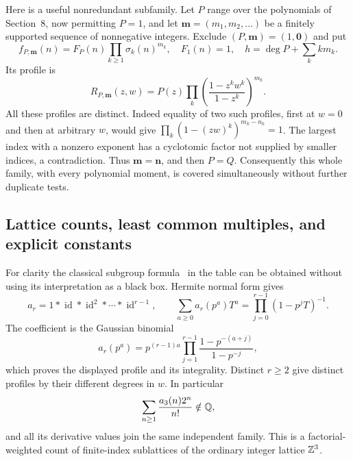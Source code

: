 Here is a useful nonredundant subfamily.  Let $P$ range over the
polynomials of Section~8, now permitting $P=1$, and let
$\mathbf m=(m_1,m_2,\ldots)$ be a finitely supported sequence of
nonnegative integers.  Exclude $(P,\mathbf m)=(1,\mathbf0)$ and put
\[
 f_{P,\mathbf m}(n)=F_P(n)\prod_{k\geq1}\sigma_k(n)^{m_k},
 \quad F_1(n)=1,\quad
 h=\deg P+\sum_k km_k.
\]
Its profile is
\begin{equation}\label{eq:sigma-product-profile}
 R_{P,\mathbf m}(z,w)=P(z)
       \prod_k\left(\frac{1-z^kw^k}{1-z^k}\right)^{m_k}.
\end{equation}
All these profiles are distinct.  Indeed equality of two such
profiles, first at $w=0$ and then at arbitrary $w$, would give
$\prod_k(1-(zw)^k)^{m_k-n_k}=1$.  The largest index with a
nonzero exponent has a cyclotomic factor not supplied by smaller
indices, a contradiction.  Thus $\mathbf m=\mathbf n$, and then
$P=Q$.  Consequently this whole family, with every polynomial
moment, is covered simultaneously without further duplicate tests.

\subsection{Lattice counts, least common multiples, and explicit constants}

For clarity the classical subgroup formula~\cite{Zou06} in the table can be obtained
without using its interpretation as a black box.  Hermite normal
form gives
\[
 a_r=1*\operatorname{id}*\operatorname{id}^2*\cdots*
                \operatorname{id}^{r-1},\qquad
 \sum_{a\geq0}a_r(p^a)T^a=
                \prod_{j=0}^{r-1}(1-p^jT)^{-1}.
\]
The coefficient is the Gaussian binomial
\[
 a_r(p^a)=p^{(r-1)a}
           \prod_{j=1}^{r-1}\frac{1-p^{-(a+j)}}{1-p^{-j}},
\]
which proves the displayed profile and its integrality.  Distinct
$r\geq2$ give distinct profiles by their different degrees in $w$.
In particular
\[
 \sum_{n\geq1}\frac{a_3(n)2^n}{n!}\notin\mathbb Q,
\]
and all its derivative values join the same independent family.
This is a factorial-weighted count of finite-index sublattices of
the ordinary integer lattice $\mathbb Z^3$.

